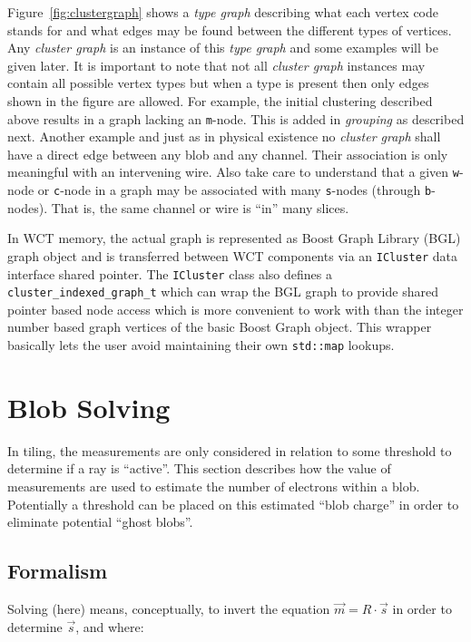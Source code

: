 \documentclass[11pt]{article}
\begin{document}
Figure~\ref{fig:clustergraph} shows a \textit{type graph} describing what each vertex code stands for and what edges may be found between the different types of vertices. 
Any \textit{cluster graph} is an instance of this \textit{type graph} and some examples will be given later. 
It is important to note that not all \textit{cluster graph} instances may contain all possible vertex types but when a type is present then only edges shown in the figure are allowed. 
For example, the initial clustering described above results in a graph lacking an \texttt{m}-node. 
This is added in \textit{grouping} as described next.
Another example and just as in physical existence no \textit{cluster graph} shall have a direct edge between any blob and any channel. 
Their association is only meaningful with an intervening wire. 
Also take care to understand that a given \texttt{w}-node or \texttt{c}-node in a graph may be associated with many \texttt{s}-nodes (through \texttt{b}-nodes). 
That is, the same channel or wire is ``in'' many slices.

In WCT memory, the actual graph is represented as Boost Graph Library (BGL) graph object and is transferred between WCT components via an \texttt{ICluster} data interface shared pointer. 
The \texttt{ICluster} class also defines a \texttt{cluster\_indexed\_graph\_t} which can wrap the BGL graph to provide shared pointer based node access which is more convenient to work with than the integer number based graph vertices of the basic Boost Graph object. 
This wrapper basically lets the user avoid maintaining their own \texttt{std::map} lookups.



\section{Blob Solving}
\label{sec:solving}

In tiling, the measurements are only considered in relation to some threshold to determine if a ray is ``active''.  This section describes how the value of measurements are used to estimate the number of electrons within a blob.   Potentially a threshold can be placed on this estimated ``blob charge'' in order to eliminate potential ``ghost blobs''. 

\subsection{Formalism}
\label{sec:formalism}

Solving (here) means, conceptually, to invert the equation \(\vec{m} = R \cdot \vec{s}\) in order to determine \(\vec{s}\), and where:
\end{document}
